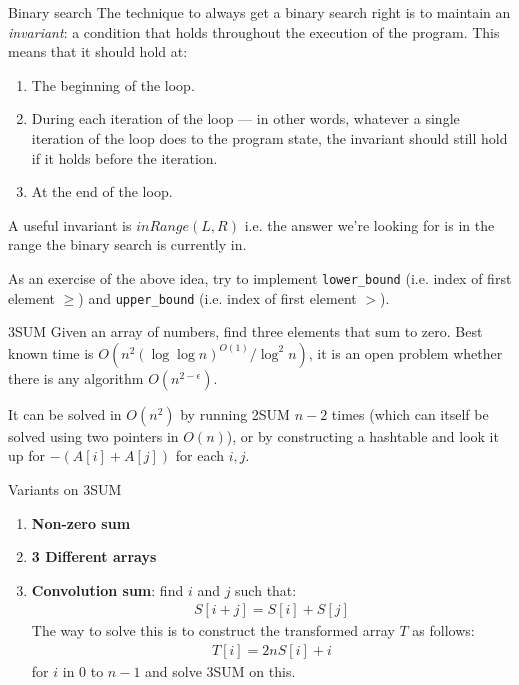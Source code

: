 \documentclass[titlepage, 12pt]{book}
\begin{document}
\begin{algorithm}{Binary search}{}
    The technique to always get a binary search right is to maintain an
    \textit{invariant}: a condition that holds throughout the execution of the
    program. This means that it should hold at:
    \begin{enumerate}
        \item The beginning of the loop.
        \item During each iteration of the loop --- in other words, whatever
            a single iteration of the loop does to the program state, the
            invariant should still hold if it holds before the iteration.
        \item At the end of the loop.
    \end{enumerate}
    A useful invariant is $inRange(L, R)$ i.e. the answer we're looking for is
    in the range the binary search is currently in.
\end{algorithm}
As an exercise of the above idea, try to implement \verb|lower_bound| (i.e.
index of first element $\geq$) and \verb|upper_bound| (i.e. index of first
element $>$).

\begin{problem}{3SUM}{}
    Given an array of numbers, find three elements that sum to zero. Best known
    time is $O(n^2(\log\log n)^{O(1)}/\log^2 n)$, it is an open problem whether there
    is any algorithm $O(n^{2 - \epsilon})$.
\end{problem}

It can be solved in $O(n^2)$ by running 2SUM $n - 2$ times (which can itself be
solved using two pointers in $O(n)$), or by constructing a hashtable and look it
up for $- (A[i] + A[j])$ for each $i, j$.

Variants on 3SUM

\begin{enumerate}
    \item \textbf{Non-zero sum}
    \item \textbf{3 Different arrays}
    \item \textbf{Convolution sum}: find $i$ and $j$ such that:
        \begin{align*}
            S[i + j] = S[i] + S[j]
        \end{align*}
        The way to solve this is to construct the transformed array $T$ as
        follows:
        \begin{align*}
            T[i] = 2nS[i] + i
        \end{align*}
        for $i$ in 0 to $n - 1$ and solve 3SUM on this.
\end{enumerate}
\end{document}
